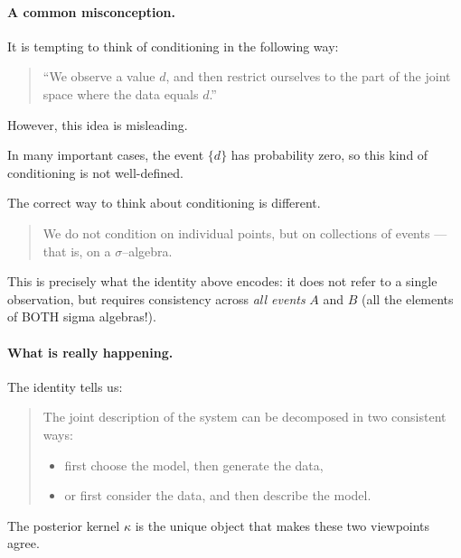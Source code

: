 \documentclass[11pt]{article}
\theoremstyle{remark}
\begin{document}
\vspace{2mm}

\paragraph{A common misconception.}

It is tempting to think of conditioning in the following way:

\begin{quote}
``We observe a value \(d\), and then restrict ourselves to the part of the joint space where the data equals \(d\).''
\end{quote}

However, this idea is misleading.

In many important cases, the event \(\{d\}\) has probability zero, so this kind of conditioning is not well-defined.

\vspace{2mm}

The correct way to think about conditioning is different.

\begin{quote}
We do not condition on individual points, but on collections of events — that is, on a \(\sigma\)--algebra.
\end{quote}

This is precisely what the identity above encodes: it does not refer to a single observation, but requires consistency across \emph{all events} \(A\) and \(B\) (all the elements of BOTH sigma algebras!).

\vspace{2mm}

\paragraph{What is really happening.}

The identity tells us:

\begin{quote}
The joint description of the system can be decomposed in two consistent ways:
\begin{itemize}
    \item first choose the model, then generate the data,
    \item or first consider the data, and then describe the model.
\end{itemize}
\end{quote}

The posterior kernel \(\kappa\) is the unique object that makes these two viewpoints agree.
\end{document}
